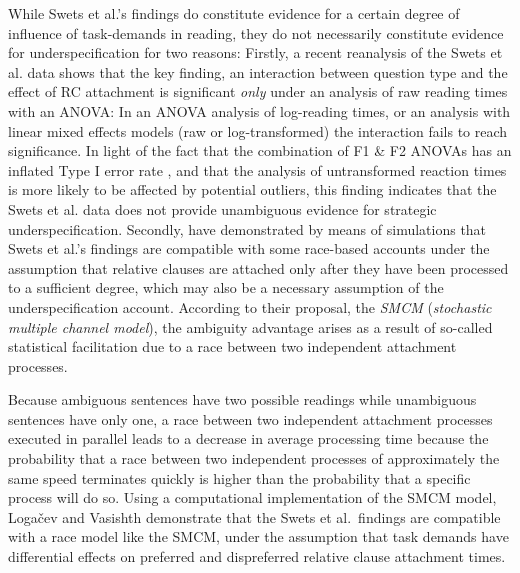 \documentclass[english, doc]{apa7}\usepackage[]{graphicx}\usepackage[]{color}
\begin{document}
While Swets et al.'s findings do constitute evidence for a certain degree of influence of task-demands in reading, they do not necessarily constitute evidence for underspecification for two reasons:
%
Firstly, a recent reanalysis of the Swets et al. data \citep{Vasishth:2021Blog} shows that the key finding, an interaction between question type and the effect of RC attachment is significant \textit{only} under an analysis of raw reading times with an ANOVA: In an ANOVA analysis of log-reading times, or an analysis with linear mixed effects models (raw or log-transformed) the interaction fails to reach significance. 
In light of the fact that the combination of F1 \& F2 ANOVAs has an inflated Type I error rate
\citep{baayen2008mixed}, and that the analysis of untransformed reaction times is more likely  to be affected by potential outliers, this finding indicates that the Swets et al. data does not provide unambiguous evidence for strategic underspecification.
%
Secondly, \cite{LogacevVasishth:2016} have demonstrated by means of simulations that Swets et al.'s findings are compatible with some race-based accounts under the assumption that relative clauses are attached only after they have been processed to a sufficient degree, which may also be a necessary assumption of the underspecification account. According to their proposal, the \emph{SMCM} (\emph{stochastic multiple channel model}), the ambiguity advantage arises as a result of so-called statistical facilitation \citep{Raab:1962} due to a race between two independent attachment processes.

Because ambiguous sentences have two possible readings while unambiguous sentences have only one, a race between two independent attachment processes executed in parallel leads to a decrease in average processing time because the probability that a race between two independent processes of approximately the same speed terminates quickly is higher than the probability that a specific process will do so. Using a computational implementation of the SMCM model, Logačev and Vasishth demonstrate that the Swets et al.~findings are compatible with a race model like the SMCM, under the assumption that task demands have differential effects on preferred and dispreferred relative clause attachment times.
\end{document}
